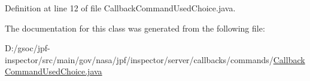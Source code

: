 Definition at line 12 of file Callback\+Command\+Used\+Choice.\+java.



The documentation for this class was generated from the following file\+:\begin{DoxyCompactItemize}
\item 
D\+:/gsoc/jpf-\/inspector/src/main/gov/nasa/jpf/inspector/server/callbacks/commands/\hyperlink{_callback_command_used_choice_8java}{Callback\+Command\+Used\+Choice.\+java}\end{DoxyCompactItemize}
